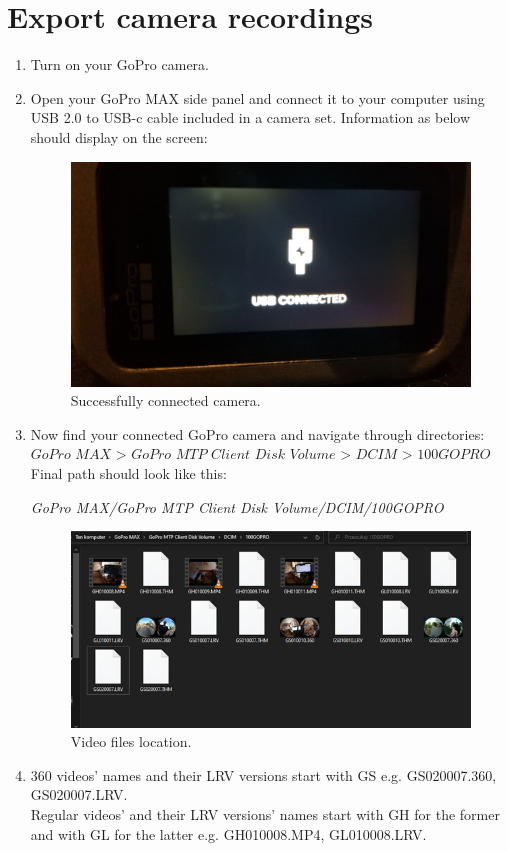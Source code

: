 \documentclass[a4paper,12pt]{book}
\begin{document}
\section{Export camera recordings}
\begin{enumerate}
\item Turn on your GoPro camera.
\item Open your GoPro MAX side panel and connect it to your computer using USB 2.0 to USB-c cable included in a camera set. Information as below should display on the screen:
\begin{figure}[H]
	\centering
	\includegraphics{camera_connected}
	\caption{Successfully connected camera.}
\end{figure} 

\item Now find your connected GoPro camera and navigate through directories:\\

$\textit{GoPro MAX > GoPro MTP Client Disk Volume > DCIM > 100GOPRO}$	\\

Final path should look like this:

\textit{GoPro MAX/GoPro MTP Client Disk Volume/DCIM/100GOPRO}	
\begin{figure}[H]
	\centering
	\includegraphics{recording_location}
	\caption{Video files location.}
\end{figure}
\hfill
\item 360 videos’ names and their LRV versions start with GS e.g. GS020007.360, GS020007.LRV.\\

Regular videos’ and their LRV versions’ names start with GH for the former and with GL for the latter e.g. GH010008.MP4, GL010008.LRV. \\
\end{enumerate}
\end{document}
